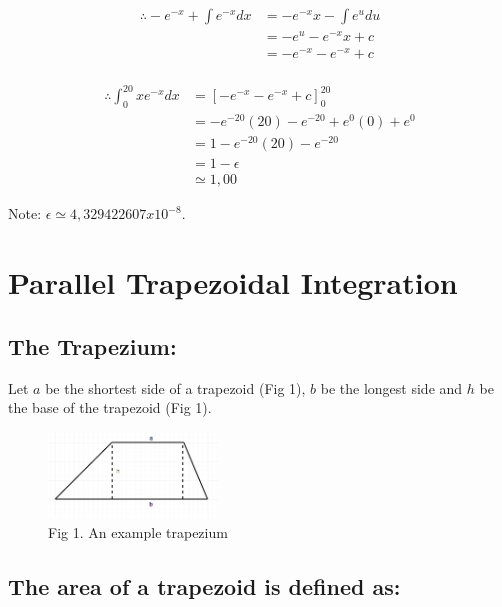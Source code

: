\documentclass[11pt]{article}
\begin{document}
\begin{page}
\begin{equation}
\begin{aligned}
    \therefore{} -e^{-x} + \int e^{-x} dx &= -e^{-x}x - \int e^{u} du\\
    & = -e^{u} - e^{-x}x + c\\
    & = -e^{-x} - e^{-x} + c 
\end{aligned}
\end{equation}
\\

\begin{equation}
\begin{aligned}
    \therefore{} \int_{0}^{20} xe^{-x} dx &= \left[-e^{-x} - e^{-x} + c\right]_{0}^{20} \\
    & = -e^{-20}(20) - e^{-20} + e^{0}(0) + e^{0}\\
    & = 1 - e^{-20}(20) - e^{-20}\\
    & = 1 - \epsilon{}\\
    & \simeq{} 1,00
\end{aligned}
\end{equation}

Note: $\epsilon{} \simeq{} 4,329422607 x 10^{-8}$.
\\
\break
\section{Parallel Trapezoidal Integration}
\subsection{The Trapezium:}
\noindent Let $a$ be the shortest side of a trapezoid (Fig 1), $b$ be the longest side and $h$ be the base of the trapezoid (Fig 1).

\begin{figure}[ht]
\centering
     \includegraphics[width=0.40\textwidth]{trapezium}\\
     Fig 1. An example trapezium
\end{figure}

\subsection{The area of a trapezoid is defined as:} 


\end{page}
\end{document}

